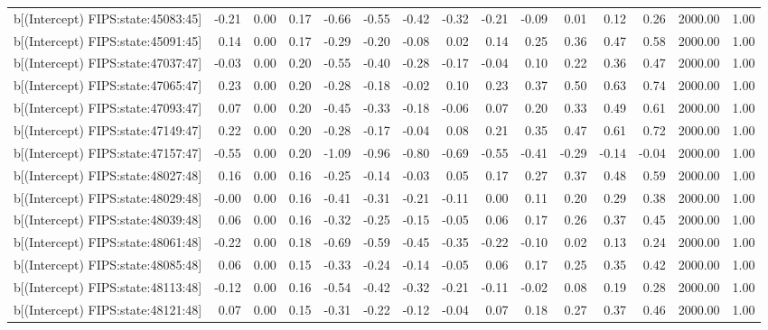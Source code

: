 \begin{table}[ht]
\begin{tabular}{rrrrrrrrrrrrrrr}
  b[(Intercept) FIPS:state:45083:45] & -0.21 & 0.00 & 0.17 & -0.66 & -0.55 & -0.42 & -0.32 & -0.21 & -0.09 & 0.01 & 0.12 & 0.26 & 2000.00 & 1.00 \\ 
  b[(Intercept) FIPS:state:45091:45] & 0.14 & 0.00 & 0.17 & -0.29 & -0.20 & -0.08 & 0.02 & 0.14 & 0.25 & 0.36 & 0.47 & 0.58 & 2000.00 & 1.00 \\ 
  b[(Intercept) FIPS:state:47037:47] & -0.03 & 0.00 & 0.20 & -0.55 & -0.40 & -0.28 & -0.17 & -0.04 & 0.10 & 0.22 & 0.36 & 0.47 & 2000.00 & 1.00 \\ 
  b[(Intercept) FIPS:state:47065:47] & 0.23 & 0.00 & 0.20 & -0.28 & -0.18 & -0.02 & 0.10 & 0.23 & 0.37 & 0.50 & 0.63 & 0.74 & 2000.00 & 1.00 \\ 
  b[(Intercept) FIPS:state:47093:47] & 0.07 & 0.00 & 0.20 & -0.45 & -0.33 & -0.18 & -0.06 & 0.07 & 0.20 & 0.33 & 0.49 & 0.61 & 2000.00 & 1.00 \\ 
  b[(Intercept) FIPS:state:47149:47] & 0.22 & 0.00 & 0.20 & -0.28 & -0.17 & -0.04 & 0.08 & 0.21 & 0.35 & 0.47 & 0.61 & 0.72 & 2000.00 & 1.00 \\ 
  b[(Intercept) FIPS:state:47157:47] & -0.55 & 0.00 & 0.20 & -1.09 & -0.96 & -0.80 & -0.69 & -0.55 & -0.41 & -0.29 & -0.14 & -0.04 & 2000.00 & 1.00 \\ 
  b[(Intercept) FIPS:state:48027:48] & 0.16 & 0.00 & 0.16 & -0.25 & -0.14 & -0.03 & 0.05 & 0.17 & 0.27 & 0.37 & 0.48 & 0.59 & 2000.00 & 1.00 \\ 
  b[(Intercept) FIPS:state:48029:48] & -0.00 & 0.00 & 0.16 & -0.41 & -0.31 & -0.21 & -0.11 & 0.00 & 0.11 & 0.20 & 0.29 & 0.38 & 2000.00 & 1.00 \\ 
  b[(Intercept) FIPS:state:48039:48] & 0.06 & 0.00 & 0.16 & -0.32 & -0.25 & -0.15 & -0.05 & 0.06 & 0.17 & 0.26 & 0.37 & 0.45 & 2000.00 & 1.00 \\ 
  b[(Intercept) FIPS:state:48061:48] & -0.22 & 0.00 & 0.18 & -0.69 & -0.59 & -0.45 & -0.35 & -0.22 & -0.10 & 0.02 & 0.13 & 0.24 & 2000.00 & 1.00 \\ 
  b[(Intercept) FIPS:state:48085:48] & 0.06 & 0.00 & 0.15 & -0.33 & -0.24 & -0.14 & -0.05 & 0.06 & 0.17 & 0.25 & 0.35 & 0.42 & 2000.00 & 1.00 \\ 
  b[(Intercept) FIPS:state:48113:48] & -0.12 & 0.00 & 0.16 & -0.54 & -0.42 & -0.32 & -0.21 & -0.11 & -0.02 & 0.08 & 0.19 & 0.28 & 2000.00 & 1.00 \\ 
  b[(Intercept) FIPS:state:48121:48] & 0.07 & 0.00 & 0.15 & -0.31 & -0.22 & -0.12 & -0.04 & 0.07 & 0.18 & 0.27 & 0.37 & 0.46 & 2000.00 & 1.00 \\ 

\end{tabular}
\end{table}
